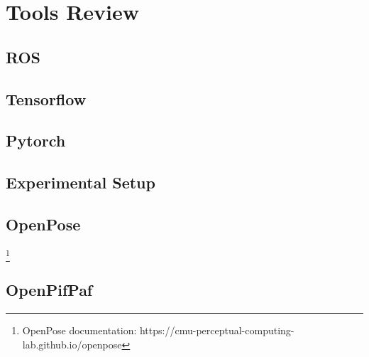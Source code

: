 \chapter{Tools Review}
\label{chapter:tools_review}

\section{ROS}

\section{Tensorflow}

\section{Pytorch}

\section{Experimental Setup}

\section{OpenPose}
\label{section:openpose}

\cite{Cao2021,Simon2017,Cao2018,Wei2016}
\footnote{OpenPose documentation: https://cmu-perceptual-computing-lab.github.io/openpose}

\section{OpenPifPaf}